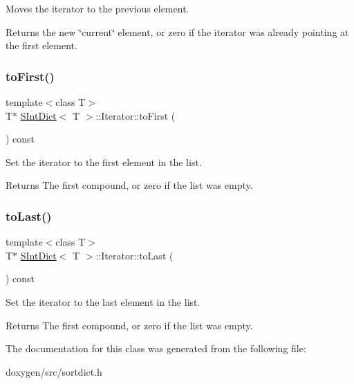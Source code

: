 Moves the iterator to the previous element. \begin{DoxyReturn}{Returns}
the new \char`\"{}current\char`\"{} element, or zero if the iterator was already pointing at the first element. 
\end{DoxyReturn}
\mbox{\label{class_s_int_dict_1_1_iterator_ac77b3f93a0c4f47efdf231c0a5167a02}} 
\subsubsection{\texorpdfstring{toFirst()}{toFirst()}}
{\footnotesize\ttfamily template$<$class T$>$ \\
T$\ast$ \mbox{\hyperlink{class_s_int_dict}{S\+Int\+Dict}}$<$ T $>$\+::Iterator\+::to\+First (\begin{DoxyParamCaption}{ }\end{DoxyParamCaption}) const\hspace{0.3cm}{\ttfamily [inline]}}

Set the iterator to the first element in the list. \begin{DoxyReturn}{Returns}
The first compound, or zero if the list was empty. 
\end{DoxyReturn}
\mbox{\label{class_s_int_dict_1_1_iterator_ae999652fa13a88d029bbeb9ce1887dc4}} 
\subsubsection{\texorpdfstring{toLast()}{toLast()}}
{\footnotesize\ttfamily template$<$class T$>$ \\
T$\ast$ \mbox{\hyperlink{class_s_int_dict}{S\+Int\+Dict}}$<$ T $>$\+::Iterator\+::to\+Last (\begin{DoxyParamCaption}{ }\end{DoxyParamCaption}) const\hspace{0.3cm}{\ttfamily [inline]}}

Set the iterator to the last element in the list. \begin{DoxyReturn}{Returns}
The first compound, or zero if the list was empty. 
\end{DoxyReturn}


The documentation for this class was generated from the following file\+:\begin{DoxyCompactItemize}
\item 
doxygen/src/sortdict.\+h\end{DoxyCompactItemize}

